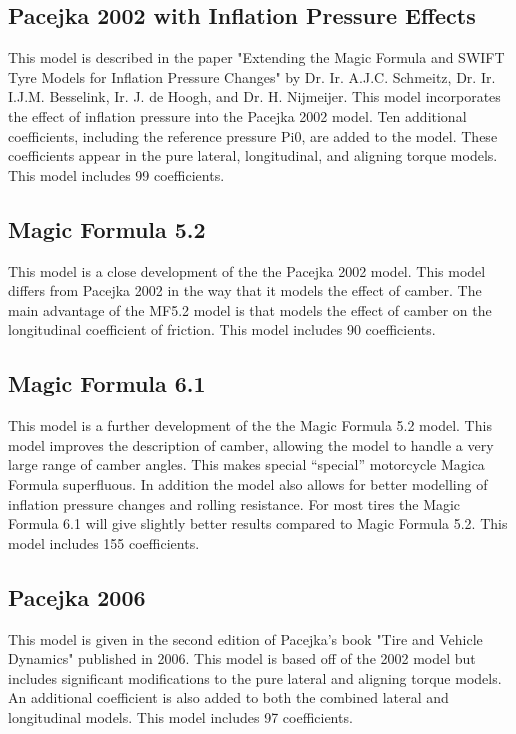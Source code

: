 \subsection{Pacejka 2002 with Inflation Pressure Effects}
\label{sec:Pacejka2002withInflationPressureEffects}
This model is described in the paper "Extending the Magic Formula and SWIFT Tyre Models for Inflation Pressure Changes" by Dr. Ir. A.J.C. Schmeitz, Dr. Ir. I.J.M. Besselink, Ir. J. de Hoogh, and Dr. H. Nijmeijer. This model incorporates the effect of inflation pressure into the Pacejka 2002 model. Ten additional coefficients, including the reference pressure Pi0, are added to the model. These coefficients appear in the pure lateral, longitudinal, and aligning torque models. This model includes 99 coefficients.

\subsection{Magic Formula 5.2}
\label{sec:MagicFormula52}
This model is a close development of the the Pacejka 2002 model. This model differs from Pacejka 2002 in the way that it models the effect of camber. The main advantage of the MF5.2 model is that models the effect of camber on the longitudinal coefficient of friction. This model includes 90 coefficients.

\subsection{Magic Formula 6.1}
\label{sec:MagicFormula61}
This model is a further development of the the Magic Formula 5.2 model. This model improves the description of camber, allowing the model to handle a very large range of camber angles. This makes special "`special"' motorcycle Magica Formula superfluous. In addition the model also allows for better modelling of inflation pressure changes and rolling resistance. For most tires the Magic Formula 6.1 will give slightly better results compared to Magic Formula 5.2. This model includes 155 coefficients.

\subsection{Pacejka 2006}
\label{sec:Pacejka2006}
This model is given in the second edition of Pacejka's book "Tire and Vehicle Dynamics" published in 2006. This model is based off of the 2002 model but includes significant modifications to the pure lateral and aligning torque models. An additional coefficient is also added to both the combined lateral and longitudinal models. This model includes 97 coefficients.

